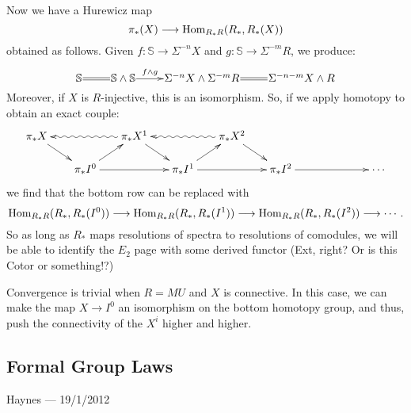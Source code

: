 \documentclass[11pt]{article}
\newcommand{\CONVERSATION}[3]{
\subsection*{#1}
\begin{flushright}
{\small #2 --- #3}
\end{flushright}
}
\begin{document}
Now we have a Hurewicz map 
\[\pi_{*}(X)\longrightarrow\operatorname{Hom}_{R_*R}(R_*,R_*(X))\]
 obtained as follows. Given $f:\mathbb{S}\to \Sigma^{-n}X$ and $g:\mathbb{S}\to \Sigma^{-m}R$, we produce:
\[
\xymatrix@1{
\mathbb{S}\ar@{=}[r]&%
\mathbb{S}\sprod\mathbb{S}\ar[r]^-{f\sprod g}&%
\Sigma^{-n}X\sprod \Sigma^{-m}R\ar@{=}[r]&%
\Sigma^{-n-m}X\sprod R
}\]
Moreover, if $X$ is $R$-injective, this is an isomorphism. So, if we apply homotopy to obtain an exact couple:
\[\xymatrix@R=.5cm@C=.5cm@!C{
\pi_*X\ar[dr]&%
&%
\pi_*X^1\ar@{~>}[ll]\ar[dr]&%
&%
\pi_*X^2\ar@{~>}[ll]\ar[dr]&%
&%
&%
\\%
&%
\ar[ur]\pi_*I^0\ar[rr]&%
&%
\ar[ur]\pi_*I^1\ar[rr]&%
&%
\pi_*I^2\ar[rr]&%
&%
\cdots%
}\]
we find that the bottom row can be replaced with
\[\operatorname{Hom}_{R_*R}(R_*,R_*(I^0))\longrightarrow\operatorname{Hom}_{R_*R}(R_*,R_*(I^1))\longrightarrow\operatorname{Hom}_{R_*R}(R_*,R_*(I^2))\longrightarrow\cdots.\]
So as long as $R_*$ maps resolutions of spectra to resolutions of comodules, we will be able to identify the  $E_2$ page with some derived functor (Ext, right? Or is this Cotor or something!?)

\begin{rmk*}
Convergence is trivial when $R=MU$ and $X$ is connective. In this case, we can make the map $X\to I^0$ an isomorphism on the bottom homotopy group, and thus, push the connectivity of the $X^i$ higher and higher.
\end{rmk*}


\pagebreak
\CONVERSATION{Formal Group Laws}{Haynes}{19/1/2012}
\end{document}
